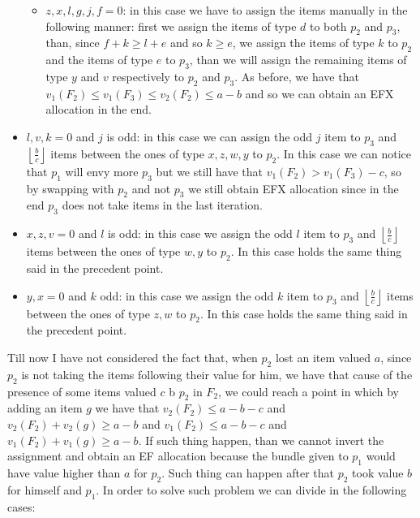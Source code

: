 \documentclass{article}
\newcommand{\floor}[3][2]{\left \lfloor\frac{#2}{#3}\right \rfloor}
\begin{document}
\begin{itemize}
\begin{itemize}
        \item $z,x,l,g,j,f=0$: in this case we have to assign the items manually in the following manner: first we assign the items of type $d$ to both $p_2$ and $p_3$, than, since $f+k\ge l+e$ and so $k\ge e$, we assign the items of type $k$ to $p_2$ and the items of type $e$ to $p_3$, than we will assign the remaining items of type $y$ and $v$ respectively to $p_2$ and $p_3$. As before, we have that $v_1(F_2)\le v_1(F_3) \le v_2(F_2)\le a-b$ and so we can obtain an EFX allocation in the end.
    \end{itemize}
    \item $l,v,k=0$ and $j$ is odd: in this case we can assign the odd $j$ item to $p_3$ and $\floor{b}{c}$ items between the ones of type $x,z,w,y$ to $p_2$. In this case we can notice that $p_1$ will envy more $p_3$ but we still have that $v_1(F_2) > v_1(F_3) - c$, so by swapping with $p_2$ and not $p_3$ we still obtain EFX allocation since in the end $p_3$ does not take items in the last iteration.
    \item $x,z,v=0$ and $l$ is odd: in this case we assign the odd $l$ item to $p_3$ and $\floor{b}{c}$ items between the ones of type $w,y$ to $p_2$. In this case holds the same thing said in the precedent point.
    \item $y,x=0$ and $k$ odd: in this case we assign the odd $k$ item to $p_3$ and $\floor{b}{c}$ items between the ones of type $z,w$ to $p_2$. In this case holds the same thing said in the precedent point.
\end{itemize}
Till now I have not considered the fact that, when $p_2$ lost an item valued $a$, since $p_2$ is not taking the items following their value for him, we have that cause of the presence of some items valued $c$ b $p_2$ in $F_2$, we could reach a point in which by adding an item $g$ we have that $v_2(F_2) \le a-b-c$ and $v_2(F_2) +v_2(g)\ge a-b$ and $v_1(F_2) \le a-b-c$ and $v_1(F_2) +v_1(g)\ge a-b$. If such thing happen, than we cannot invert the assignment and obtain an EF allocation because the bundle given to $p_1$ would have value higher than $a$ for $p_2$. Such thing can happen after that $p_2$ took value $b$ for himself and $p_1$. In order to solve such problem we can divide in the following cases:
\end{document}
